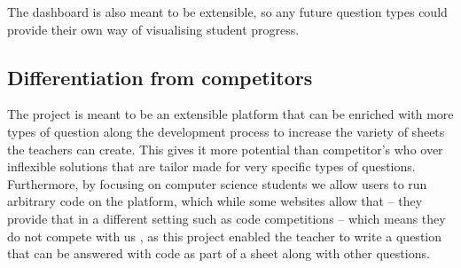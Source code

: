 The dashboard is also meant to be extensible, so any future question types could provide their own way of visualising student progress.

\subsection{Differentiation from competitors}
The project is meant to be an extensible platform that can be enriched with more types of question along the development process to increase the variety of sheets the teachers can create. This gives it more potential than competitor’s who over inflexible solutions that are tailor made for very specific types of questions.
Furthermore, by focusing on computer science students we allow users to run arbitrary code on the platform, which while some websites allow that – they provide that in a different setting such as code competitions – which means they do not compete with us , as this project enabled the teacher to write a question that can be answered with code as part of a sheet along with other questions.
